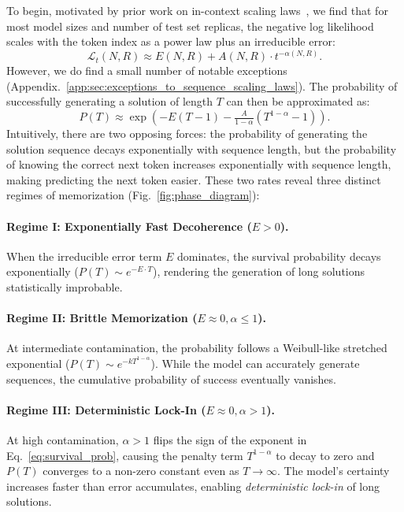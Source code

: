 To begin, motivated by prior work on in-context scaling laws~\citep{anthropic2023claude2,geminiteam2024gemini15unlockingmultimodal,xiong2024effective,anil2024many}, we find that for most model sizes and number of test set replicas, the negative log likelihood scales with the token index as a power law plus an irreducible error:
%
\begin{equation}\label{eqn:in_context_scaling_law}
    \mathcal{L}_t(N, R) \approx E(N, R) + A(N, R) \cdot t^{-\alpha(N, R)}.
\end{equation}
%
However, we do find a small number of notable exceptions (Appendix.~\ref{app:sec:exceptions_to_sequence_scaling_laws}).
The probability of successfully generating a solution of length $T$ can then be approximated as:
%
\begin{equation}
    \label{eq:survival_prob}
    P(T) \approx \exp\left( -E(T-1) - \tfrac{A}{1-\alpha}(T^{1-\alpha} - 1) \right).
\end{equation}
%
Intuitively, there are two opposing forces: the probability of generating the solution sequence decays exponentially with sequence length, but the probability of knowing the correct next token increases exponentially with sequence length, making predicting the next token easier.
These two rates reveal three distinct regimes of memorization (Fig.~\ref{fig:phase_diagram}):

\paragraph{Regime I: Exponentially Fast Decoherence ($E > 0$).}
When the irreducible error term $E$ dominates, the survival probability decays exponentially ($P(T) \sim e^{-E \cdot T}$), rendering the generation of long solutions statistically improbable.

\paragraph{Regime II: Brittle Memorization ($E \approx 0, \alpha \le 1$).}
At intermediate contamination, the probability follows a Weibull-like stretched exponential ($P(T) \sim e^{-k T^{1-\alpha}}$). While the model can accurately generate sequences, the cumulative probability of success eventually vanishes.

\paragraph{Regime III: Deterministic Lock-In ($E \approx 0, \alpha > 1$).}
At high contamination, $\alpha > 1$ flips the sign of the exponent in Eq.~\ref{eq:survival_prob}, causing the penalty term $T^{1-\alpha}$ to decay to zero and $P(T)$ converges to a non-zero constant even as $T \to \infty$. The model's certainty increases faster than error accumulates, enabling \textit{deterministic lock-in} of long solutions.

